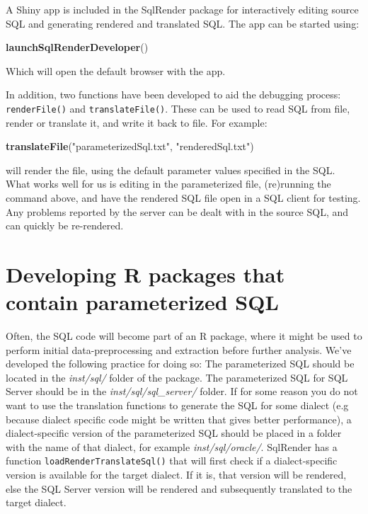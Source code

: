 \documentclass[
]{article}
\newenvironment{Shaded}{\begin{snugshade}}{\end{snugshade}}
\newcommand{\KeywordTok}[1]{\textcolor[rgb]{0.13,0.29,0.53}{\textbf{#1}}}
\newcommand{\NormalTok}[1]{#1}
\newcommand{\StringTok}[1]{\textcolor[rgb]{0.31,0.60,0.02}{#1}}
\begin{document}
A Shiny app is included in the SqlRender package for interactively
editing source SQL and generating rendered and translated SQL. The app
can be started using:

\begin{Shaded}
\begin{Highlighting}[]
\KeywordTok{launchSqlRenderDeveloper}\NormalTok{()}
\end{Highlighting}
\end{Shaded}

Which will open the default browser with the app.

In addition, two functions have been developed to aid the debugging
process: \texttt{renderFile()} and \texttt{translateFile()}. These can
be used to read SQL from file, render or translate it, and write it back
to file. For example:

\begin{Shaded}
\begin{Highlighting}[]
\KeywordTok{translateFile}\NormalTok{(}\StringTok{"parameterizedSql.txt"}\NormalTok{, }\StringTok{"renderedSql.txt"}\NormalTok{)}
\end{Highlighting}
\end{Shaded}

will render the file, using the default parameter values specified in
the SQL. What works well for us is editing in the parameterized file,
(re)running the command above, and have the rendered SQL file open in a
SQL client for testing. Any problems reported by the server can be dealt
with in the source SQL, and can quickly be re-rendered.

\hypertarget{developing-r-packages-that-contain-parameterized-sql}{%
\section{Developing R packages that contain parameterized
SQL}\label{developing-r-packages-that-contain-parameterized-sql}}

Often, the SQL code will become part of an R package, where it might be
used to perform initial data-preprocessing and extraction before further
analysis. We've developed the following practice for doing so: The
parameterized SQL should be located in the \emph{inst/sql/} folder of
the package. The parameterized SQL for SQL Server should be in the
\emph{inst/sql/sql\_server/} folder. If for some reason you do not want
to use the translation functions to generate the SQL for some dialect
(e.g because dialect specific code might be written that gives better
performance), a dialect-specific version of the parameterized SQL should
be placed in a folder with the name of that dialect, for example
\emph{inst/sql/oracle/}. SqlRender has a function
\texttt{loadRenderTranslateSql()} that will first check if a
dialect-specific version is available for the target dialect. If it is,
that version will be rendered, else the SQL Server version will be
rendered and subsequently translated to the target dialect.
\end{document}
